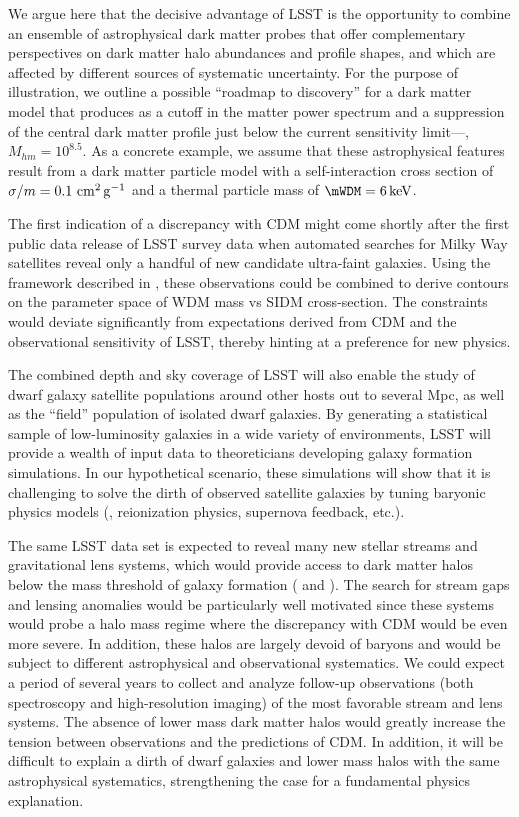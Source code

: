 We argue here that the decisive advantage of LSST is the opportunity to combine an ensemble of astrophysical dark matter probes that offer complementary perspectives on dark matter halo abundances and profile shapes, and which are affected by different sources of systematic uncertainty.
For the purpose of illustration, we outline a possible ``roadmap to discovery'' for a dark matter model that produces as a cutoff in the matter power spectrum and a suppression of the central dark matter profile just below the current sensitivity limit---\ie, $M_{hm} = 10^{8.5}$.
As a concrete example, we assume that these astrophysical features result from a dark matter particle model with a self-interaction cross section of $\sigma/m = 0.1 \mathrm{\,\mathrm{\,cm}^2\mathrm{\,g}^{-1}}$ and a thermal particle mass of $\mWDM = 6 \keV$.

The first indication of a discrepancy with CDM might come shortly after the first public data release of LSST survey data when automated searches for Milky Way satellites reveal only a handful of new candidate ultra-faint galaxies. 
Using the framework described in , these observations could be combined to derive contours on the parameter space of WDM mass vs SIDM cross-section.
The constraints would deviate significantly from expectations derived from CDM and the observational sensitivity of LSST, thereby hinting at a preference for new physics.

The combined depth and sky coverage of LSST will also enable the study of dwarf galaxy satellite populations around other hosts out to several Mpc, as well as the ``field'' population of isolated dwarf galaxies.
By generating a statistical sample of low-luminosity galaxies in a wide variety of environments, LSST will provide a wealth of input data to theoreticians developing galaxy formation simulations.
In our hypothetical scenario, these simulations will show that it is challenging to solve the dirth of observed satellite galaxies by tuning baryonic physics models (\eg, reionization physics, supernova feedback, etc.).

The same LSST data set is expected to reveal many new stellar streams and gravitational lens systems, which would provide access to dark matter halos below the mass threshold of galaxy formation ( and ).
The search for stream gaps and lensing anomalies would be particularly well motivated since these systems would probe a halo mass regime where the discrepancy with CDM would be even more severe.
In addition, these halos are largely devoid of baryons and would be subject to different astrophysical and observational systematics.
We could expect a period of several years to collect and analyze follow-up observations (both spectroscopy and high-resolution imaging) of the most favorable stream and lens systems.
The absence of lower mass dark matter halos would greatly increase the tension between observations and the predictions of CDM.
In addition, it will be difficult to explain a dirth of dwarf galaxies and lower mass halos with the same astrophysical systematics, strengthening the case for a fundamental physics explanation.

